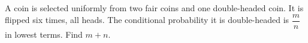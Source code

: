 A coin is selected uniformly from two fair coins and one double-headed coin. It is flipped six times, all heads. The conditional probability it is double-headed is $\dfrac{m}{n}$ in lowest terms. Find $m+n$.
